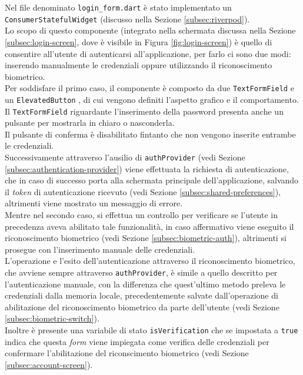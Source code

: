 Nel file denominato \lstinline{login_form.dart} è stato implementato un \lstinline{ConsumerStatefulWidget} (discusso nella Sezione \ref{subsec:riverpod}).\\
Lo scopo di questo componente (integrato nella schermata discussa nella Sezione \ref{subsec:login-screen}, dove è visibile in Figura \ref{fig:login-screen}) è quello di consentire all'utente di autenticarsi all'applicazione, per farlo ci sono due modi: inserendo manualmente le credenziali oppure utilizzando il riconoscimento biometrico.\\
Per soddisfare il primo caso, il componente è composto da due \lstinline{TextFormField} \cite{site:text-form-field} e un \lstinline{ElevatedButton} \cite{site:elevated-button}, di cui vengono definiti l'aspetto grafico e il comportamento.\\
Il \lstinline{TextFormField} riguardante l'inserimento della password presenta anche un pulsante per mostrarla in chiaro o nasconderla.\\
Il pulsante di conferma è disabilitato fintanto che non vengono inserite entrambe le credenziali.\\
Successivamente attraverso l'ausilio di \lstinline{authProvider} (vedi Sezione \ref{subsec:authentication-provider}) viene effettuata la richiesta di autenticazione, che in caso di successo porta alla schermata principale dell'applicazione, salvando il \emph{token} di autenticazione ricevuto (vedi Sezione \ref{subsec:shared-preferences}), altrimenti viene mostrato un messaggio di errore.\\ 
Mentre nel secondo caso, si effettua un controllo per verificare se l'utente in precedenza aveva abilitato tale funzionalità, in caso affermativo viene eseguito il riconoscimento biometrico (vedi Sezione \ref{subsec:biometric-auth}), altrimenti si prosegue con l'inserimento manuale delle credenziali.\\
L'operazione e l'esito dell'autenticazione attraverso il riconoscimento biometrico, che avviene sempre attraverso \lstinline{authProvider}, è simile a quello descritto per l'autenticazione manuale, con la differenza che quest'ultimo metodo preleva le credenziali dalla memoria locale, precedentemente salvate dall'operazione di abilitazione del riconoscimento biometrico da parte dell'utente (vedi Sezione \ref{subsec:biometric-switch}). \\
Inoltre è presente una variabile di stato \lstinline{isVerification} che se impostata a \lstinline{true} indica che questa \emph{form} viene impiegata come verifica delle credenziali per confermare l'abilitazione del riconscimento biometrico (vedi Sezione \ref{subsec:account-screen}).

